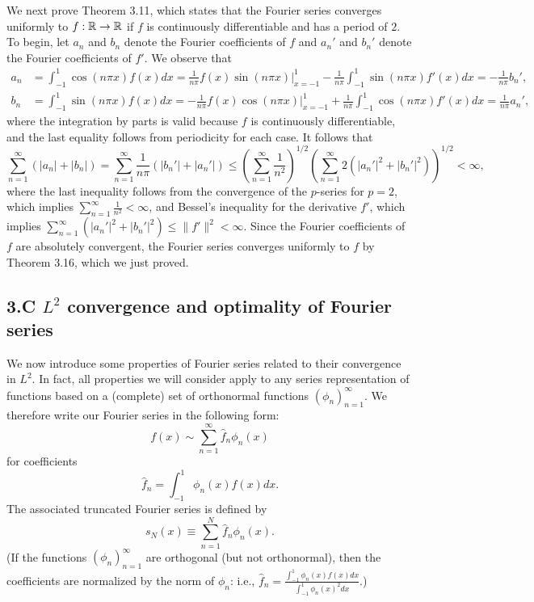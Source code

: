 We next prove Theorem 3.11, which states that the Fourier series converges uniformly to $f : \mathbb{R} \to \mathbb{R}$ if $f$ is continuously differentiable and has a period of $2$. To begin, let $a_n$ and $b_n$ denote the Fourier coefficients of $f$ and $a_n'$ and $b_n'$ denote the Fourier coefficients of $f'$. We observe that
\begin{align*}
    a_n &= \int_{-1}^{1} \cos(n\pi x) f(x) dx = \frac{1}{n\pi} f(x) \sin(n\pi x) \Big|_{x=-1}^{1} - \frac{1}{n\pi} \int_{-1}^{1} \sin(n\pi x) f'(x) dx = -\frac{1}{n\pi} b_n', \\
    b_n &= \int_{-1}^{1} \sin(n\pi x) f(x) dx = -\frac{1}{n\pi} f(x) \cos(n\pi x) \Big|_{x=-1}^{1} + \frac{1}{n\pi} \int_{-1}^{1} \cos(n\pi x) f'(x) dx = \frac{1}{n\pi} a_n',
\end{align*}
where the integration by parts is valid because $f$ is continuously differentiable, and the last equality follows from periodicity for each case. It follows that
\[\sum_{n=1}^{\infty} (|a_n| + |b_n|) = \sum_{n=1}^{\infty} \frac{1}{n\pi} (|b_n'| + |a_n'|) \leq \left(\sum_{n=1}^{\infty} \frac{1}{n^2}\right)^{1/2} \left(\sum_{n=1}^{\infty} 2(|a_n'|^2 + |b_n'|^2)\right)^{1/2} < \infty,\]
where the last inequality follows from the convergence of the $p$-series for $p = 2$, which implies $\sum_{n=1}^{\infty} \frac{1}{n^2} < \infty$, and Bessel's inequality for the derivative $f'$, which implies $\sum_{n=1}^{\infty} (|a_n'|^2 + |b_n'|^2) \leq \|f'\|^2 < \infty$. Since the Fourier coefficients of $f$ are absolutely convergent, the Fourier series converges uniformly to $f$ by Theorem 3.16, which we just proved.

\subsection{3.C $L^2$ convergence and optimality of Fourier series}
We now introduce some properties of Fourier series related to their convergence in $L^2$. In fact, all properties we will consider apply to any series representation of functions based on a (complete) set of orthonormal functions $(\phi_n)_{n=1}^{\infty}$. We therefore write our Fourier series in the following form:
\[f(x) \sim \sum_{n=1}^{\infty} \hat{f}_n \phi_n(x)\]
for coefficients
\[\hat{f}_n = \int_{-1}^{1} \phi_n(x) f(x) dx.\]
The associated truncated Fourier series is defined by
\[s_N(x) \equiv \sum_{n=1}^{N} \hat{f}_n \phi_n(x).\]
(If the functions $(\phi_n)_{n=1}^{\infty}$ are orthogonal (but not orthonormal), then the coefficients are normalized by the norm of $\phi_n$: i.e., $\hat{f}_n = \frac{\int_{-1}^{1} \phi_n(x) f(x) dx}{\int_{-1}^{1} \phi_n(x)^2 dx}$.)

